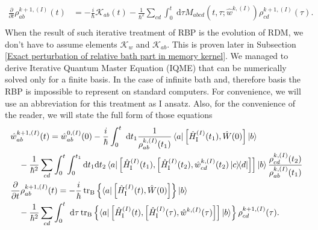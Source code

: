 \begin{equation}
\label{ansatz_RDM_iterative}
    \begin{aligned}
    \frac{\partial}{\partial t} \rho_{ab}^{k+1, (I)}(t)&=-\frac{i}{\hbar}\mathcal{K}_{ab}(t) -\frac{1}{\hbar^{2}} \sum_{cd}\int_{0}^{t} \mathrm{~d}\tau M_{abcd}(t, \tau; \hat{w}^{k, (I)})\rho^{k+1,(I)}_{cd}(\tau). \\
    \end{aligned}
\end{equation}
When the result of such iterative treatment of RBP is the evolution of RDM, we don't have to assume elements $\mathcal{K}_w$ and $\mathcal{K}_{ab}$. This is proven later in Subsection \ref{Exact perturbation of relative bath part in memory kernel}. We managed to derive Iterative Quantum Master Equation (IQME) that can be numerically solved only for a finite basis. In the case of infinite bath and, therefore basis the RBP is impossible to represent on standard computers. For convenience, we will use an abbreviation for this treatment as I ansatz. Also, for the convenience of the reader, we will state the full form of those equations
\begin{equation}
\label{iterative_quantum_master_equations}
    \begin{aligned}
    &\hat{w}^{k+1,(I)}_{ab}(t) = \hat{w}^{0, (I)}_{ab}(0) -\frac{i}{\hbar} \int_{0}^{t} \mathrm{~d} t_1  \frac{1}{\rho^{k, (I)}_{ab}(t_1)} \bra{a}\left[\hat{H}_{\mathrm{I}}^{(I)}(t_1), \hat{W}(0)\right]\ket{b} \\
     &\quad -\frac{1}{\hbar^{2}} \sum_{cd} \int_{0}^{t} \int_{0}^{t_1} \mathrm{d} t_1 \mathrm{d} t_2 \bra{a} \left[\hat{H}_{\mathrm{I}}^{(I)}(t_1),\left[\hat{H}_{\mathrm{I}}^{(I)}(t_2), \hat{w}^{k, (I)}_{cd}(t_2)  \ketbra{c}{d} \right]\right] \ket{b} \frac{\rho^{k, (I)}_{cd}(t_2) }{ \rho^{k, (I)}_{ab}(t_1)} \\
     &\frac{\partial}{\partial t} \rho_{ab}^{k+1, (I)}(t)=-\frac{i}{\hbar} \operatorname{tr}_{\mathrm{B}}   \left\{ \bra{a}\left[\hat{H}_{\mathrm{I}}^{(I)}(t), \hat{W}(0)\right]\right\}  \ket{b}\\
     &\quad -\frac{1}{\hbar^{2}} \sum_{cd}\int_{0}^{t} \mathrm{~d}\tau  \operatorname{tr}_{\mathrm{B}}   \left\{ \bra{a} \left[\hat{H}_{\mathrm{I}}^{(I)}(t),\left[\hat{H}_{\mathrm{I}}^{(I)}(\tau), \hat{w}^{k, (I)}(\tau) \right]\right] \ket{b} \right\}   \rho^{k+1,(I)}_{cd}(\tau). 
    \end{aligned}
\end{equation}


